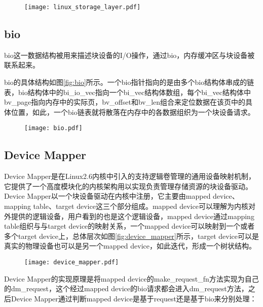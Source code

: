 \begin{figure}[H]
    \centering
    \texttt{[image: linux\_storage\_layer.pdf]}
\end{figure}

\subsection{bio}
\label{sec:bio}

bio这一数据结构被用来描述块设备的I/O操作，通过bio，内存缓冲区与块设备被联系起来\cite{corbet2005linux}。

bio的具体结构如图\ref{fig:bio}所示。一个bio指针指向的是由多个bio结构体串成的链表，bio结构体中的bi\_io\_vec指向一个bi\_vec结构体数组，每个bi\_vec结构体中bv\_page指向内存中的实际页，bv\_offset和bv\_len组合来定位数据在该页中的具体位置，如此，一个bio链表就将散落在内存中的各数据组织为一个块设备请求。

\begin{figure}[H]
    \centering
    \texttt{[image: bio.pdf]}
\end{figure}

\subsection{Device Mapper}

Device Mapper是在Linux2.6内核中引入的支持逻辑卷管理的通用设备映射机制，它提供了一个高度模块化的内核架构用以实现负责管理存储资源的块设备驱动\cite{bovet2005understanding}。Device Mapper以一个块设备驱动在内核中注册，它主要由mapped device、mapping table、target device这三个部分组成。mapped device可以理解为内核对外提供的逻辑设备，用户看到的也是这个逻辑设备，mapped device通过mapping table组织与与target device的映射关系，一个mapped device可以映射到一个或者多个target device上，总体层次如图\ref{fig:device_mapper}所示，target device可以是真实的物理设备也可以是另一个mapped device，如此迭代，形成一个树状结构。

\begin{figure}[!htbp]
    \centering
    \texttt{[image: device\_mapper.pdf]}
\end{figure}

Device Mapper的实现原理是将mapped device的make\_request\_fn方法实现为自己的dm\_request，这个经过mapped device的bio请求都会进入dm\_request方法，之后Device Mapper通过判断mapped device是基于request还是基于bio来分别处理：

